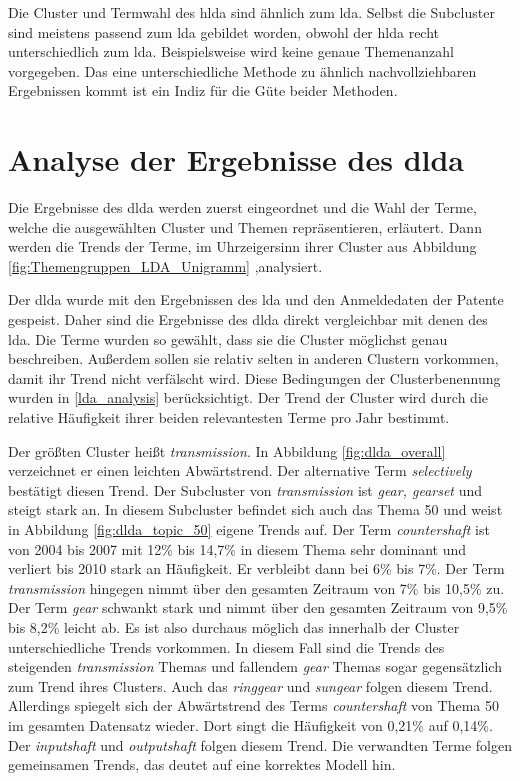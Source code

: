 Die Cluster und Termwahl des \gls{hlda} sind ähnlich zum \gls{lda}. Selbst die Subcluster sind meistens passend zum \gls{lda} gebildet worden, obwohl der \gls{hlda} recht unterschiedlich zum \gls{lda}. Beispielsweise wird keine genaue Themenanzahl vorgegeben. Das eine unterschiedliche Methode zu ähnlich nachvollziehbaren Ergebnissen kommt ist ein Indiz für die Güte beider Methoden.


\section{Analyse der Ergebnisse des \gls{dlda}}

Die Ergebnisse des \gls{dlda} werden zuerst eingeordnet und die Wahl der Terme, welche die ausgewählten Cluster und Themen repräsentieren, erläutert. Dann werden die Trends der Terme, im Uhrzeigersinn ihrer Cluster aus Abbildung \ref{fig:Themengruppen_LDA_Unigramm} ,analysiert.


Der \gls{dlda} wurde mit den Ergebnissen des \gls{lda} und den Anmeldedaten der Patente gespeist. Daher sind die Ergebnisse des \gls{dlda} direkt vergleichbar mit denen des \gls{lda}. Die Terme wurden so gewählt, dass sie die Cluster möglichst genau beschreiben. Außerdem sollen sie relativ selten in anderen Clustern vorkommen, damit ihr Trend nicht verfälscht wird. Diese Bedingungen der Clusterbenennung wurden in \ref{lda_analysis} berücksichtigt. Der Trend der Cluster wird durch die relative Häufigkeit ihrer beiden relevantesten Terme pro Jahr bestimmt.


Der größten Cluster heißt \emph{transmission}. In Abbildung \ref{fig:dlda_overall} verzeichnet er einen leichten Abwärtstrend. Der alternative Term \emph{selectively} bestätigt diesen Trend. Der Subcluster von \emph{transmission} ist \emph{gear, gearset} und steigt stark an. In diesem Subcluster befindet sich auch das Thema 50 und weist in Abbildung \ref{fig:dlda_topic_50} eigene Trends auf. Der Term \emph{countershaft} ist von 2004 bis 2007 mit 12\% bis 14,7\% in diesem Thema sehr dominant und verliert bis 2010 stark an Häufigkeit. Er verbleibt dann bei 6\% bis 7\%. Der Term \emph{transmission} hingegen nimmt über den gesamten Zeitraum von 7\% bis 10,5\% zu. Der Term \emph{gear} schwankt stark und nimmt über den gesamten Zeitraum von 9,5\% bis 8,2\% leicht ab. Es ist also durchaus möglich das innerhalb der Cluster unterschiedliche Trends vorkommen. In diesem Fall sind die Trends des steigenden \emph{transmission} Themas und fallendem \emph{gear} Themas sogar gegensätzlich zum Trend ihres Clusters. Auch das \emph{ringgear} und \emph{sungear} folgen diesem Trend. Allerdings spiegelt sich der Abwärtstrend des Terms \emph{countershaft} von Thema 50 im gesamten Datensatz wieder. Dort singt die Häufigkeit von 0,21\% auf 0,14\%. Der \emph{inputshaft} und \emph{outputshaft} folgen diesem Trend. Die verwandten Terme folgen gemeinsamen Trends, das deutet auf eine korrektes Modell hin.

